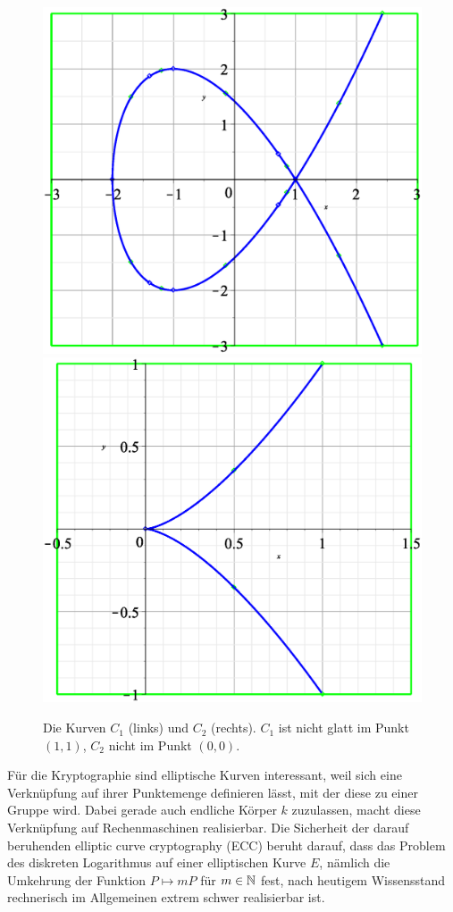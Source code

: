 \begin{figure}[H]
	\centering
	\includegraphics[scale=.3]{img/curve_0_3.eps} \hspace{2cm}
	\includegraphics[scale=.3]{img/curve_0_4.eps}
	\caption{Die Kurven $C_1$ (links) und $C_2$ (rechts). $C_1$ ist nicht glatt im Punkt $(1,1)$, $C_2$ nicht im Punkt $(0,0)$.}
	\label{fig:bsp}
\end{figure}

Für die Kryptographie sind elliptische Kurven interessant, weil sich eine Verknüpfung auf ihrer Punktemenge definieren lässt, mit der diese zu einer Gruppe wird. Dabei gerade auch endliche Körper $k$ zuzulassen, macht diese Verknüpfung auf Rechenmaschinen realisierbar. Die Sicherheit der darauf beruhenden elliptic curve cryptography (ECC) beruht darauf, dass das Problem des diskreten Logarithmus auf einer elliptischen Kurve $E$, nämlich die Umkehrung der Funktion $P \mapsto mP$ für $m \in \mathbb{N}$ fest, nach heutigem Wissensstand rechnerisch im Allgemeinen extrem schwer realisierbar ist.
\newpage
